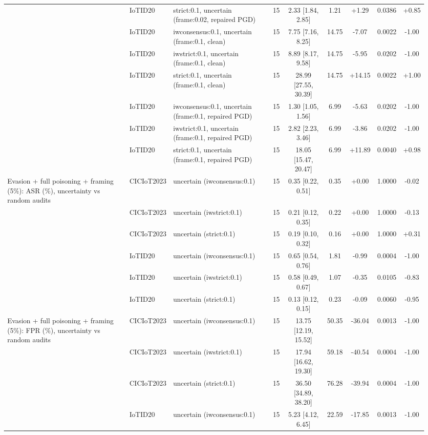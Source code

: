 \begin{table}[t]
\begin{tabular}{lllcccccc}
 & IoTID20 & strict:0.1, uncertain (frame:0.02, repaired PGD) & 15 & 2.33 [1.84, 2.85] & 1.21 & +1.29 & 0.0386 & +0.85 \\
 & IoTID20 & iwconsensus:0.1, uncertain (frame:0.1, clean) & 15 & 7.75 [7.16, 8.25] & 14.75 & -7.07 & 0.0022 & -1.00 \\
 & IoTID20 & iwstrict:0.1, uncertain (frame:0.1, clean) & 15 & 8.89 [8.17, 9.58] & 14.75 & -5.95 & 0.0202 & -1.00 \\
 & IoTID20 & strict:0.1, uncertain (frame:0.1, clean) & 15 & 28.99 [27.55, 30.39] & 14.75 & +14.15 & 0.0022 & +1.00 \\
 & IoTID20 & iwconsensus:0.1, uncertain (frame:0.1, repaired PGD) & 15 & 1.30 [1.05, 1.56] & 6.99 & -5.63 & 0.0202 & -1.00 \\
 & IoTID20 & iwstrict:0.1, uncertain (frame:0.1, repaired PGD) & 15 & 2.82 [2.23, 3.46] & 6.99 & -3.86 & 0.0202 & -1.00 \\
 & IoTID20 & strict:0.1, uncertain (frame:0.1, repaired PGD) & 15 & 18.05 [15.47, 20.47] & 6.99 & +11.89 & 0.0040 & +0.98 \\
Evasion + full poisoning + framing (5\%): ASR (\%), uncertainty vs random audits & CICIoT2023 & uncertain (iwconsensus:0.1) & 15 & 0.35 [0.22, 0.51] & 0.35 & +0.00 & 1.0000 & -0.02 \\
 & CICIoT2023 & uncertain (iwstrict:0.1) & 15 & 0.21 [0.12, 0.35] & 0.22 & +0.00 & 1.0000 & -0.13 \\
 & CICIoT2023 & uncertain (strict:0.1) & 15 & 0.19 [0.10, 0.32] & 0.16 & +0.00 & 1.0000 & +0.31 \\
 & IoTID20 & uncertain (iwconsensus:0.1) & 15 & 0.65 [0.54, 0.76] & 1.81 & -0.99 & 0.0004 & -1.00 \\
 & IoTID20 & uncertain (iwstrict:0.1) & 15 & 0.58 [0.49, 0.67] & 1.07 & -0.35 & 0.0105 & -0.83 \\
 & IoTID20 & uncertain (strict:0.1) & 15 & 0.13 [0.12, 0.15] & 0.23 & -0.09 & 0.0060 & -0.95 \\
Evasion + full poisoning + framing (5\%): FPR (\%), uncertainty vs random audits & CICIoT2023 & uncertain (iwconsensus:0.1) & 15 & 13.75 [12.19, 15.52] & 50.35 & -36.04 & 0.0013 & -1.00 \\
 & CICIoT2023 & uncertain (iwstrict:0.1) & 15 & 17.94 [16.62, 19.30] & 59.18 & -40.54 & 0.0004 & -1.00 \\
 & CICIoT2023 & uncertain (strict:0.1) & 15 & 36.50 [34.89, 38.20] & 76.28 & -39.94 & 0.0004 & -1.00 \\
 & IoTID20 & uncertain (iwconsensus:0.1) & 15 & 5.23 [4.12, 6.45] & 22.59 & -17.85 & 0.0013 & -1.00 \\

\end{tabular}
\end{table}
